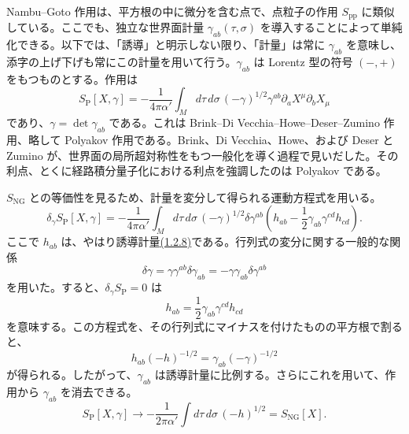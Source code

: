 Nambu--Goto 作用は、平方根の中に微分を含む点で、点粒子の作用 $S_{\mathrm{pp}}$ に類似している。ここでも、独立な世界面計量 $\gamma_{ab}(\tau,\sigma)$ を導入することによって単純化できる。以下では、「誘導」と明示しない限り、「計量」は常に $\gamma_{ab}$ を意味し、添字の上げ下げも常にこの計量を用いて行う。$\gamma_{ab}$ は Lorentz 型の符号 $(-,+)$ をもつものとする。作用は
\begin{equation}
S_{\mathrm P}[X,\gamma]=-\frac{1}{4\pi\alpha'}
\int_M d\tau\,d\sigma\,(-\gamma)^{1/2}\gamma^{ab}
\partial_aX^\mu\partial_bX_\mu
\tag{1.2.13}\label{eq:1.2.13}
\end{equation}
であり、$\gamma=\det\gamma_{ab}$ である。これは Brink--Di Vecchia--Howe--Deser--Zumino 作用、略して Polyakov 作用である。Brink、Di Vecchia、Howe、および Deser と Zumino が、世界面の局所超対称性をもつ一般化を導く過程で見いだした。その利点、とくに経路積分量子化における利点を強調したのは Polyakov である。

$S_{\mathrm{NG}}$ との等価性を見るため、計量を変分して得られる運動方程式を用いる。
\begin{equation}
\delta_\gamma S_{\mathrm P}[X,\gamma]=-\frac{1}{4\pi\alpha'}
\int_M d\tau\,d\sigma\,(-\gamma)^{1/2}\delta\gamma^{ab}
\left(h_{ab}-\frac12\gamma_{ab}\gamma^{cd}h_{cd}\right).
\tag{1.2.14}\label{eq:1.2.14}
\end{equation}
ここで $h_{ab}$ は、やはり誘導計量\hyperref[eq:1.2.8]{(1.2.8)}である。行列式の変分に関する一般的な関係
\begin{equation}
\delta\gamma=\gamma\gamma^{ab}\delta\gamma_{ab}
=-\gamma\gamma_{ab}\delta\gamma^{ab}
\tag{1.2.15}\label{eq:1.2.15}
\end{equation}
を用いた。すると、$\delta_\gamma S_{\mathrm P}=0$ は
\begin{equation}
h_{ab}=\frac12\gamma_{ab}\gamma^{cd}h_{cd}
\tag{1.2.16}\label{eq:1.2.16}
\end{equation}
を意味する。この方程式を、その行列式にマイナスを付けたものの平方根で割ると、
\begin{equation}
h_{ab}(-h)^{-1/2}=\gamma_{ab}(-\gamma)^{-1/2}
\tag{1.2.17}\label{eq:1.2.17}
\end{equation}
が得られる。したがって、$\gamma_{ab}$ は誘導計量に比例する。さらにこれを用いて、作用から $\gamma_{ab}$ を消去できる。
\begin{equation}
S_{\mathrm P}[X,\gamma]\longrightarrow
-\frac{1}{2\pi\alpha'}\int d\tau\,d\sigma\,(-h)^{1/2}
=S_{\mathrm{NG}}[X].
\tag{1.2.18}\label{eq:1.2.18}
\end{equation}

